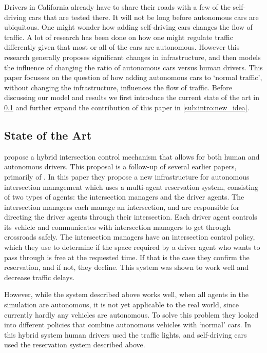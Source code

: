 Drivers in California already have to share their roads with a few of the self-driving cars that are tested there. It will not be long before autonomous cars are ubiquitous. One might wonder how adding self-driving cars changes the flow of traffic. A lot of research has been done on how one might regulate traffic differently given that most or all of the cars are autonomous. However this research generally proposes significant changes in infrastructure, and then models the influence of changing the ratio of autonomous cars versus human drivers. This paper focusses on the question of how adding autonomous cars to `normal traffic', without changing the infrastructure, influences the flow of traffic. Before discussing our model and results we first introduce the current state of the art in \cref{sub:intro:state_of_the_art} and further expand the contribution of this paper in \cref{sub:intro:new_idea}.

\subsection{State of the Art}
\label{sub:intro:state_of_the_art}
\textcite{dresner2007sharing} propose a hybrid intersection control mechanism that allows for both human and autonomous drivers. This proposal is a follow-up of several earlier papers, primarily of \cite{dresner2005traffic}. In this paper they propose a new infrastructure for autonomous intersection management which uses a multi-agent reservation system, consisting of two types of agents: the intersection managers and the driver agents. The intersection managers each manage an intersection, and are responsible for directing the driver agents through their intersection. Each driver agent controls its vehicle and communicates with intersection managers to get through crossroads safely. The intersection managers have an intersection control policy, which they use to determine if the space required by a driver agent who wants to pass through is free at the requested time. If that is the case they confirm the reservation, and if not, they decline. This system was shown to work well and decrease traffic delays. 

However, while the system described above works well, when all agents in the simulation are autonomous, it is not yet applicable to the real world, since currently hardly any vehicles are autonomous. To solve this problem they looked into different policies that combine autonomous vehicles with `normal' cars. In this hybrid system human drivers used the traffic lights, and self-driving cars used the reservation system described above.


